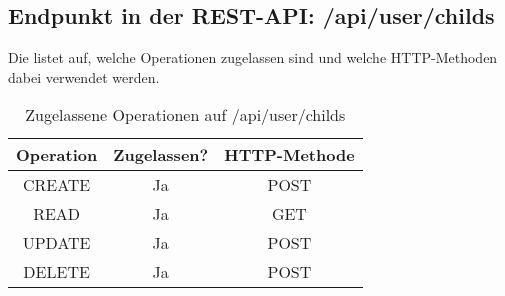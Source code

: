 \subsection{Endpunkt in der REST-API: /api/user/childs}
Die  listet auf, welche Operationen zugelassen sind und welche HTTP-Methoden dabei verwendet werden. 

\begin{table}[!htbp]
	\begin{tabular}{|c|c|c|}
		\hline
			\textbf{Operation} & \textbf{Zugelassen?} & \textbf{HTTP-Methode} \\ \hline
			CREATE & Ja & POST \\ \hline 
			READ & Ja & GET \\ \hline
			UPDATE & Ja & POST \\ \hline 
			DELETE & Ja & POST \\ \hline
	\end{tabular}

		\caption{Zugelassene Operationen auf /api/user/childs}
		\label{tab:end:rest:api:user:childs:meth}
\end{table}

